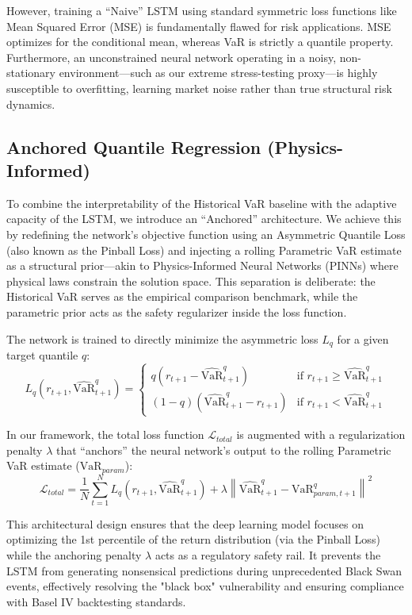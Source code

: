 However, training a ``Naive'' LSTM using standard symmetric loss functions like Mean Squared Error (MSE) is fundamentally flawed for risk applications. MSE optimizes for the conditional mean, whereas VaR is strictly a quantile property. Furthermore, an unconstrained neural network operating in a noisy, non-stationary environment---such as our extreme stress-testing proxy---is highly susceptible to overfitting, learning market noise rather than true structural risk dynamics.

\subsection{Anchored Quantile Regression (Physics-Informed)}
To combine the interpretability of the Historical VaR baseline with the adaptive capacity of the LSTM, we introduce an ``Anchored'' architecture. We achieve this by redefining the network's objective function using an Asymmetric Quantile Loss (also known as the Pinball Loss) \cite{koenker1978regression} and injecting a rolling Parametric VaR estimate as a structural prior---akin to Physics-Informed Neural Networks (PINNs) where physical laws constrain the solution space. This separation is deliberate: the Historical VaR serves as the empirical comparison benchmark, while the parametric prior acts as the safety regularizer inside the loss function.

The network is trained to directly minimize the asymmetric loss $L_q$ for a given target quantile $q$:
\begin{equation}
    L_q(r_{t+1}, \widehat{\text{VaR}}_{t+1}^q) = 
    \begin{cases} 
      q (r_{t+1} - \widehat{\text{VaR}}_{t+1}^q) & \text{if } r_{t+1} \geq \widehat{\text{VaR}}_{t+1}^q \\
      (1 - q) (\widehat{\text{VaR}}_{t+1}^q - r_{t+1}) & \text{if } r_{t+1} < \widehat{\text{VaR}}_{t+1}^q
    \end{cases}
\end{equation}

In our framework, the total loss function $\mathcal{L}_{total}$ is augmented with a regularization penalty $\lambda$ that ``anchors'' the neural network's output to the rolling Parametric VaR estimate ($\text{VaR}_{param}$):
\begin{equation}
    \mathcal{L}_{total} = \frac{1}{N} \sum_{t=1}^{N} L_q(r_{t+1}, \widehat{\text{VaR}}_{t+1}^q) + \lambda \left\| \widehat{\text{VaR}}_{t+1}^q - \text{VaR}_{param, t+1}^q \right\|^2
\end{equation}

This architectural design ensures that the deep learning model focuses on optimizing the 1st percentile of the return distribution (via the Pinball Loss) while the anchoring penalty $\lambda$ acts as a regulatory safety rail. It prevents the LSTM from generating nonsensical predictions during unprecedented Black Swan events, effectively resolving the "black box" vulnerability and ensuring compliance with Basel IV backtesting standards.
